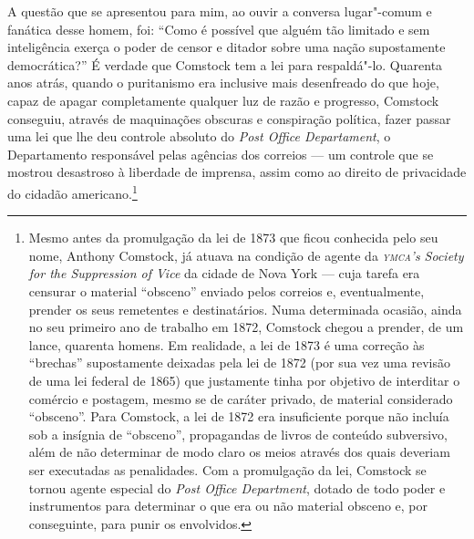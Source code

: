 A questão que se apresentou para mim, ao ouvir a conversa lugar"-comum e
fanática desse homem, foi: ``Como é possível que alguém tão limitado e
sem inteligência exerça o poder de censor e ditador sobre uma nação
supostamente democrática?'' É verdade que Comstock tem a lei para
respaldá"-lo. Quarenta anos atrás, quando o puritanismo era inclusive
mais desenfreado do que hoje, capaz de apagar completamente qualquer luz
de razão e progresso, Comstock conseguiu, através de maquinações
obscuras e conspiração política, fazer passar uma lei que lhe deu
controle absoluto do \emph{Post Office Departament}, o Departamento responsável pelas agências dos
correios --- um controle que se
mostrou desastroso à liberdade de imprensa, assim como ao direito de
privacidade do cidadão americano.\footnote{Mesmo antes da promulgação da
  lei de 1873 que ficou conhecida pelo seu nome, Anthony Comstock, já
  atuava na condição de agente da \emph{\textsc{ymca}'s Society for the
  Suppression of Vice} da cidade de Nova York --- cuja tarefa era
  censurar o material ``obsceno'' enviado pelos correios e,
  eventualmente, prender os seus remetentes e destinatários. Numa
  determinada ocasião, ainda no seu primeiro ano de trabalho em 1872,
  Comstock chegou a prender, de um lance, quarenta homens. Em realidade,
  a lei de 1873 é uma correção às ``brechas'' supostamente deixadas pela
  lei de 1872 (por sua vez uma revisão de uma lei federal de 1865) que
  justamente tinha por objetivo de interditar o comércio e postagem,
  mesmo se de caráter privado, de material considerado ``obsceno''. Para
  Comstock, a lei de 1872 era insuficiente porque não incluía sob a
  insígnia de ``obsceno'', propagandas de livros de conteúdo subversivo,
  além de não determinar de modo claro os meios através dos quais
  deveriam ser executadas as penalidades. Com a promulgação da lei,
  Comstock se tornou agente especial do \emph{Post Office Department},
  dotado de todo poder e instrumentos para determinar o que era ou não
  material obsceno e, por conseguinte, para punir os envolvidos.}

